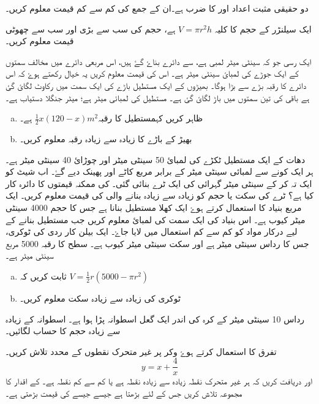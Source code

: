 دو حقیقی مثبت اعداد  اور  کا ضرب    ہے۔ان کے جمع کی کم سے کم قیمت  معلوم کریں۔

ایک سیلنڑر کے حجم کا کلیہ \(V=\pi r^{2}h \)  ہے، حجم   کی سب سے بڑی اور سب سے چھوٹی قیمت معلوم کریں۔

ایک رسی جو کہ  سینٹی میٹر لمبی ہے، سے دائرے  بناۓ گۓ ہیں، اس مربعی دائرے میں مخالف سمتوں کے ایک جوڑے کی لمبائ  سینٹی میٹر ہے۔ اس    کی قیمت معلوم کریں یہ خیال رکھتے ہوۓ کہ اس دائرے کا رقبہ بڑے سے بڑا ہوگا۔
بھیڑوں کے  ایک مستطیل باڑے کی ایک سمت میں رکاوٹ لگائ گئ ہے باقی کی تین سمتوں میں باڑ لگائ گئ ہے۔  مستطیل کی لمبائی  میٹر ہے؛ میٹر جنگلا  دستیاب ہے۔
\begin{enumerate}[a.]
\item
ظاہر کریں کہمستطیل  کا رقبہ\( \frac{1}{2}x(120-x) {m^2} \) ہے۔
\item
بھیڑ کے باڑے کا زیادہ سے زیادہ رقبہ معلوم کریں۔
\end{enumerate}
دھات کے ایک مستطیل ٹکڑے کی لمبائ 50 سینٹی میٹر اور چوڑائ  40 سینٹی میٹر ہے۔ ہر ایک کونے سے لمبائی   سینٹی میٹر کے برابر مربع کاٹے اور پھینک دیے گۓ۔ اب شیٹ کو ایک تہ کر کے  سینٹی میٹر گہرائی کی ایک ٹرے بنائی گئی۔ کی ممکنہ قیمتوں کا دائرہ کار کیا ہے؟ ٹرے کی  سکت یا حجم  کو زیادہ سے زیادہ بنانے والی   کی قیمت معلوم کریں۔
ایک مربع بنیاد کا استعمال کرتے ہوۓ ایک کھلا مستطیل بنانا ہے جس کا حجم 4000 سینٹی میٹر کیوب ہے۔ اس بنیاد کی ایک سمت کی لمبائ معلوم کریں جب مستطیل بنانے کے لیے درکار مواد کو کم سے کم استعمال میں لایا جاۓ۔
ایک بیلن کار ردی کی ٹوکری، جس کا رداس سینٹی میٹر ہے اور سکت  سینٹی میٹر کیوب ہے۔ سطح کا رقبہ 5000  مربع سینٹی میٹر  ہے۔
\begin{enumerate}[a.]
\item
ثابت کریں کہ \( V=\frac{1}{2}r(5000-\pi r^2) \)
\item
ٹوکری کی زیادہ سے زیادہ   سکت معلوم کریں۔
\end{enumerate}

رداس 10 سینٹی میٹر کے کرہ کی اندر ایک گعل اسطوانہ پڑا ہوا ہے۔  اسطوانہ کے زیادہ سے زیادہ حجم کا حساب لگائیں۔


تفرق کا استعمال کرتے ہوۓ وکر پر غیر متحرک نقطوں کے محدد  تلاش کریں۔
\[ y=x+\frac{4}{x} \]
اور  دریافت کریں کہ ہر غیر متحرک نقطہ زیادہ سے زیادہ نقطہ ہے یا کم سے کم نقطہ ہے۔  کے اقدار کا مجموعہ تلاش کریں جس کے لئے   بڑھتا ہے جیسے  جیسے  کی قیمت بڑھتی ہے۔

